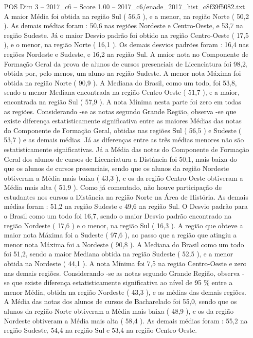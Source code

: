 \begin{textsample}{POS Dim 3 – 2017\_c6 – Score 1.00 – 2017\_c6/enade\_2017\_hist\_c8f39f5082.txt}
A maior Média foi obtida na região Sul ( 56,5 ), e a menor, na região Norte ( 50,2 ).
As demais médias foram : 50,6 nas regiões Nordeste e Centro-Oeste, e 53,7 na região Sudeste.
Já o maior Desvio padrão foi obtido na região Centro-Oeste ( 17,5 ), e o menor, na região Norte ( 16,1 ).
Os demais desvios padrões foram : 16,4 nas regiões Nordeste e Sudeste, e 16,2 na região Sul.
A maior nota no Componente de Formação Geral da prova de alunos de cursos presenciais de Licenciatura foi 98,2, obtida por, pelo menos, um aluno na região Sudeste.
A menor nota Máxima foi obtida na região Norte ( 90,9 ).
A Mediana do Brasil, como um todo, foi 53,8, sendo a menor Mediana encontrada na região Centro-Oeste ( 51,7 ), e a maior, encontrada na região Sul ( 57,9 ).
A nota Mínima nesta parte foi zero em todas as regiões.
Considerando -se as notas segundo Grande Região, observa -se que existe diferença estatisticamente significativa entre as maiores Médias das notas do Componente de Formação Geral, obtidas nas regiões Sul ( 56,5 ) e Sudeste ( 53,7 ) e as demais médias.
Já as diferenças entre as três médias menores não são estatisticamente significativas.
Já a Média das notas do Componente de Formação Geral dos alunos de cursos de Licenciatura a Distância foi 50,1, mais baixa do que os alunos de cursos presenciais, sendo que os alunos da região Nordeste obtiveram a Média mais baixa ( 43,3 ), e os da região Centro-Oeste obtiveram a Média mais alta ( 51,9 ).
Como já comentado, não houve participação de estudantes nos cursos a Distância na região Norte na Área de História.
As demais médias foram : 51,2 na região Sudeste e 49,6 na região Sul.
O Desvio padrão para o Brasil como um todo foi 16,7, sendo o maior Desvio padrão encontrado na região Nordeste ( 17,6 ) e o menor, na região Sul ( 16,3 ).
A região que obteve a maior nota Máxima foi a Sudeste ( 97,6 ), ao passo que a região que atingiu a menor nota Máxima foi a Nordeste ( 90,8 ).
A Mediana do Brasil como um todo foi 51,2, sendo a maior Mediana obtida na região Sudeste ( 52,5 ), e a menor obtida na Nordeste ( 44,1 ).
A nota Mínima foi 7,5 na região Centro-Oeste e zero nas demais regiões.
Considerando -se as notas segundo Grande Região, observa -se que existe diferença estatisticamente significativa ao nível de 95 \% entre a menor Média, obtida na região Nordeste ( 43,3 ), e as médias das demais regiões.
A Média das notas dos alunos de cursos de Bacharelado foi 55,0, sendo que os alunos da região Norte obtiveram a Média mais baixa ( 48,9 ), e os da região Nordeste obtiveram a Média mais alta ( 58,4 ).
As demais médias foram : 55,2 na região Sudeste, 54,4 na região Sul e 53,4 na região Centro-Oeste.

\end{textsample}
